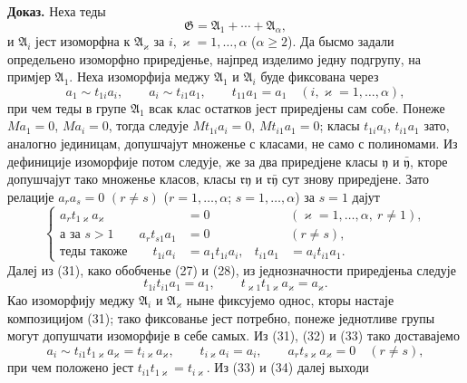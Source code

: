 ﻿\documentclass[11pt]{article}
\begin{document}
\textbf{Доказ.} Неха теды
\[
  \mathfrak G=\mathfrak A_1+\cdots+\mathfrak A_\alpha,
\]
и \(\mathfrak A_i\) јест изоморфна к \(\mathfrak A_\varkappa\) за \(i,\varkappa=1,\ldots,\alpha\) (\(\alpha\ge2\)). Да бысмо задали определьено изоморфно приредјенье, најпред изделимо једну подгрупу, на примјер \(\mathfrak A_1\). Неха изоморфија меджу \(\mathfrak A_1\) и \(\mathfrak A_i\) буде фиксована через
\begin{equation}
 a_1\sim t_{1i}a_i,\qquad a_i\sim t_{i1}a_1,\qquad t_{11}a_1=a_1
 \quad (i,\varkappa=1,\ldots,\alpha),
\tag{31}
\end{equation}
при чем теды в групе \(\mathfrak A_1\) всак клас остатков јест приредјены сам собе. Понеже \(Ma_1=0\), \(Ma_i=0\), тогда следује \(Mt_{1i}a_i=0\), \(Mt_{i1}a_1=0\); класы \(t_{1i}a_i\), \(t_{i1}a_1\) зато, аналогно јединицам, допушчајут множенье с класами, не само с полиномами. Из дефиниције изоморфије потом следује, же за два приредјене класы \(\mathfrak y\) и \(\bar{\mathfrak y}\), кторе допушчајут тако множенье класов, класы \(\mathfrak r\mathfrak y\) и \(\mathfrak r\bar{\mathfrak y}\) сут знову приредјене. Зато релације \(a_ra_s=0\) \((r\ne s)\) (\(r=1,\ldots,\alpha\); \(s=1,
\ldots,\alpha\)) за \(s=1\) дајут
\begin{equation}
\left\{
\begin{aligned}
 a_r t_{1\varkappa}a_\varkappa&=0 &&(\varkappa=1,
\ldots,\alpha,
\ r\ne1),\\
 \text{а за }s>1\qquad a_r t_{s1}a_1&=0 &&(r\ne s),\\
 \text{теды такоже}\qquad t_{1i}a_i&=a_1t_{1i}a_i,
 & t_{i1}a_1&=a_it_{i1}a_1.
\end{aligned}\right.
\tag{32}
\end{equation}
Далеј из (31), како обобченье (27) и (28), из једнозначности приредјеньа следује
\begin{equation}
 t_{1i}t_{i1}a_1=a_1,
 \qquad
 t_{\varkappa1}t_{1\varkappa}a_\varkappa=a_\varkappa.
\tag{33}
\end{equation}
Као изоморфију меджу \(\mathfrak A_i\) и \(\mathfrak A_\varkappa\) ныне фиксујемо однос, кторы настаје композицијом (31); тако фиксованье јест потребно, понеже једнотливе групы могут допушчати изоморфије в себе самых. Из (31), (32) и (33) тако доставајемо
\begin{equation}
 a_i\sim t_{i1}t_{1\varkappa}a_\varkappa=t_{i\varkappa}a_\varkappa,
 \qquad
 t_{i\varkappa}a_i=a_i,
 \qquad
 a_rt_{s\varkappa}a_\varkappa=0\quad (r\ne s),
\tag{34}
\end{equation}
при чем положено јест \(t_{i1}t_{1\varkappa}=t_{i\varkappa}\). Из (33) и (34) далеј выходи
\end{document}

